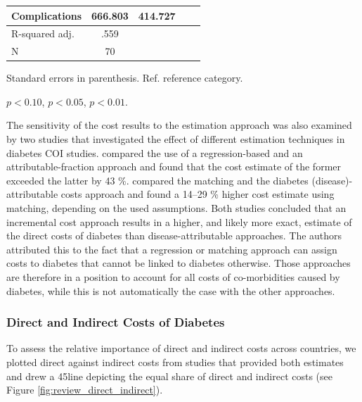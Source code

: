 \documentclass[12pt,english]{article}
\begin{document}
\begin{table}[h]
\begin{center}
\begin{adjustbox}{max width=\textwidth}
\begin{threeparttable}
{\begin{tabular}{l*{2}{SS}}
                Complications & 666.803 & 414.727 \\
\midrule
                R-squared adj. & .559 &  \\
                N & 70 &  \\ 
 \bottomrule
\end{tabular}
\begin{tablenotes}
\item Standard errors in parenthesis. Ref. reference category.
\item \sym{*} \(p<0.10\), \sym{**} \(p<0.05\), \sym{***} \(p<0.01\).
\end{tablenotes}
}
\end{threeparttable}
\end{adjustbox}
\end{center}
\end{table}

The sensitivity of the cost results to the estimation approach was also examined by two studies that investigated the effect of different estimation techniques in diabetes \ac{COI} studies. \textcite{Honeycutt2009a} compared the use of a regression-based and an attributable-fraction approach and found that the cost estimate of the former exceeded the latter by 43 \%. \textcite{Tunceli2010c} compared the matching and the diabetes (disease)-attributable costs approach and found a 14--29 \% higher cost estimate using matching, depending on the used assumptions. Both studies concluded that an incremental cost approach results in a higher, and likely more exact, estimate of the direct costs of diabetes than disease-attributable approaches. The authors attributed this to the fact that a regression or matching approach can assign costs to diabetes that cannot be linked to diabetes otherwise. Those approaches are therefore in a position to account for all costs of co-morbidities caused by diabetes, while this is not automatically the case with the other approaches.

\subsubsection{Direct and Indirect Costs of Diabetes}

To assess the relative importance of direct and indirect costs across countries, we plotted direct against indirect costs from studies that provided both estimates and drew a 45\degree line depicting the equal share of direct and indirect costs (see Figure \ref{fig:review_direct_indirect}).
\end{document}
